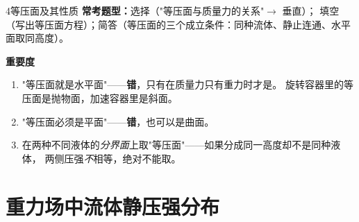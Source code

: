 \begin{kaodian}{4}{等压面及其性质}
\textbf{常考题型：}选择（"等压面与质量力的关系"$\to$ 垂直）；
填空（写出等压面方程）；简答（等压面的三个成立条件：同种流体、静止连通、水平面取同高度）。

\textbf{重要度 }\quad{}\quad{}

\begin{yicuo}
\begin{enumerate}
\item "等压面就是水平面"——\textbf{错}，只有在质量力只有重力时才是。
旋转容器里的等压面是抛物面，加速容器里是斜面。
\item "等压面必须是平面"——\textbf{错}，也可以是曲面。
\item 在两种不同液体的\emph{分界面}上取"等压面"——如果分成同一高度却不是同种液体，
  两侧压强\emph{不}相等，绝对不能取。
\end{enumerate}
\end{yicuo}
\end{kaodian}

\section{重力场中流体静压强分布}

